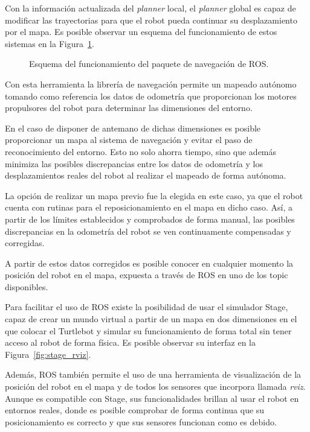 Con la información actualizada del \textit{planner} local, el \textit{planner} global es capaz de modificar las trayectorias para que el robot pueda continuar su desplazamiento por el mapa.
Es posible observar un esquema del funcionamiento de estos sistemas en la Figura~\ref{fig:move_base}.

\begin{figure}[H]
    \centering
    \def\svgwidth{0.8\linewidth}
    
	\caption{Esquema del funcionamiento del paquete de navegación de ROS.}
    \label{fig:move_base}
\end{figure}

Con esta herramienta la librería de navegación permite un mapeado autónomo tomando como referencia los datos de odometría que proporcionan los motores propulsores del robot para determinar las dimensiones del entorno.

En el caso de disponer de antemano de dichas dimensiones es posible proporcionar un mapa al sistema de navegación y evitar el paso de reconocimiento del entorno.
Esto no solo ahorra tiempo, sino que además minimiza las posibles discrepancias entre los datos de odometría y los desplazamientos reales del robot al realizar el mapeado de forma autónoma.

La opción de realizar un mapa previo fue la elegida en este caso, ya que el robot cuenta con rutinas para el reposicionamiento en el mapa en dicho caso.
Así, a partir de los límites establecidos y comprobados de forma manual, las posibles discrepancias en la odometría del robot se ven continuamente compensadas y corregidas.

A partir de estos datos corregidos es posible conocer en cualquier momento la posición del robot en el mapa, expuesta a través de ROS en uno de los topic disponibles.

Para facilitar el uso de ROS existe la posibilidad de usar el simulador Stage, capaz de crear un mundo virtual a partir de un mapa en dos dimensiones en el que colocar el Turtlebot y simular su funcionamiento de forma total sin tener acceso al robot de forma física.
Es posible observar su interfaz en la Figura~\ref{fig:stage_rviz}.

Además, ROS también permite el uso de una herramienta de visualización de la posición del robot en el mapa y de todos los sensores que incorpora llamada \textit{rviz}.
Aunque es compatible con Stage, sus funcionalidades brillan al usar el robot en entornos reales, donde es posible comprobar de forma continua que su posicionamiento es correcto y que sus sensores funcionan como es debido.


